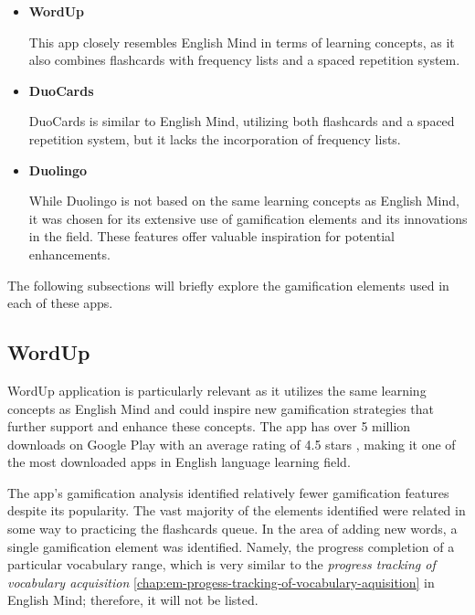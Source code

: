 \begin{itemize}
    \item \textbf{WordUp} \cite{cite:wordup}

    This app closely resembles English Mind in terms of learning concepts, as it also combines flashcards with frequency lists and a spaced repetition system.

    \item \textbf{DuoCards} \cite{cite:duocards}

    DuoCards is similar to English Mind, utilizing both flashcards and a spaced repetition system, but it lacks the incorporation of frequency lists.

    \item \textbf{Duolingo} \cite{cite:duolingo}

    While Duolingo is not based on the same learning concepts as English Mind, it was chosen for its extensive use of gamification elements and its innovations in the field. These features offer valuable inspiration for potential enhancements.
    
\end{itemize}

The following subsections will briefly explore the gamification elements used in each of these apps.

\subsection{WordUp}

WordUp application is particularly relevant as it utilizes the same learning concepts as English Mind and could inspire new gamification strategies that further support and enhance these concepts. The app has over 5 million downloads on Google Play with an average rating of 4.5 stars \cite{cite:wordup_google_play}, making it one of the most downloaded apps in English language learning field.

The app's gamification analysis identified relatively fewer gamification features despite its popularity. The vast majority of the elements identified were related in some way to practicing the flashcards queue. In the area of adding new words, a single gamification element was identified. Namely, the progress completion of a particular vocabulary range, which is very similar to the \textit{progress tracking of vocabulary acquisition} \ref{chap:em-progess-tracking-of-vocabulary-aquisition} in English Mind; therefore, it will not be listed.

